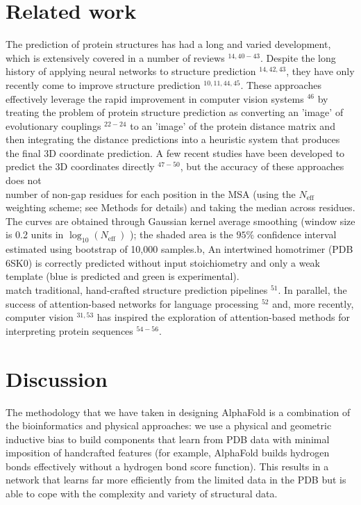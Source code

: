 \documentclass[10pt]{article}
\begin{document}
\section*{Related work}
The prediction of protein structures has had a long and varied development, which is extensively covered in a number of reviews ${ }^{14,40-43}$. Despite the long history of applying neural networks to structure prediction ${ }^{14,42,43}$, they have only recently come to improve structure prediction ${ }^{10,11,44,45}$. These approaches effectively leverage the rapid improvement in computer vision systems ${ }^{46}$ by treating the problem of protein structure prediction as converting an 'image' of evolutionary couplings ${ }^{22-24}$ to an 'image' of the protein distance matrix and then integrating the distance predictions into a heuristic system that produces the final 3D coordinate prediction. A few recent studies have been developed to predict the 3D coordinates directly ${ }^{47-50}$, but the accuracy of these approaches does not\\
number of non-gap residues for each position in the MSA (using the $N_{\text {eff }}$ weighting scheme; see Methods for details) and taking the median across residues. The curves are obtained through Gaussian kernel average smoothing (window size is 0.2 units in $\log _{10}\left(N_{\text {eff }}\right)$ ); the shaded area is the $95 \%$ confidence interval estimated using bootstrap of 10,000 samples.b, An intertwined homotrimer (PDB 6SK0) is correctly predicted without input stoichiometry and only a weak template (blue is predicted and green is experimental).\\
match traditional, hand-crafted structure prediction pipelines ${ }^{51}$. In parallel, the success of attention-based networks for language processing ${ }^{52}$ and, more recently, computer vision ${ }^{31,53}$ has inspired the exploration of attention-based methods for interpreting protein sequences ${ }^{54-56}$.

\section*{Discussion}
The methodology that we have taken in designing AlphaFold is a combination of the bioinformatics and physical approaches: we use a physical and geometric inductive bias to build components that learn from PDB data with minimal imposition of handcrafted features (for example, AlphaFold builds hydrogen bonds effectively without a hydrogen bond score function). This results in a network that learns far more efficiently from the limited data in the PDB but is able to cope with the complexity and variety of structural data.
\end{document}
